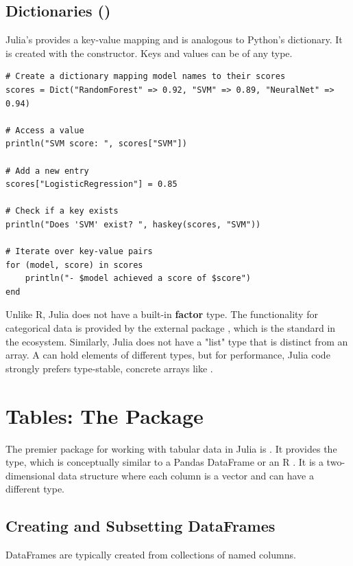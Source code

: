 \subsection*{Dictionaries ()}
Julia's \textbf{} provides a key-value mapping and is analogous to Python's dictionary. It is created with the  constructor. Keys and values can be of any type.

\text{ }\begin{verbatim}
# Create a dictionary mapping model names to their scores
scores = Dict("RandomForest" => 0.92, "SVM" => 0.89, "NeuralNet" => 0.94)

# Access a value
println("SVM score: ", scores["SVM"])

# Add a new entry
scores["LogisticRegression"] = 0.85

# Check if a key exists
println("Does 'SVM' exist? ", haskey(scores, "SVM"))

# Iterate over key-value pairs
for (model, score) in scores
    println("- $model achieved a score of $score")
end
\end{verbatim}

\begin{remark}
Unlike R, Julia does not have a built-in \textbf{factor} type. The functionality for categorical data is provided by the external package \textbf{}, which is the standard in the ecosystem. Similarly, Julia does not have a "list" type that is distinct from an array. A  can hold elements of different types, but for performance, Julia code strongly prefers type-stable, concrete arrays like .
\end{remark}

\section{Tables: The  Package}
\label{sec:julia_dataframes}
The premier package for working with tabular data in Julia is \textbf{}. It provides the  type, which is conceptually similar to a Pandas DataFrame or an R . It is a two-dimensional data structure where each column is a vector and can have a different type.

\subsection*{Creating and Subsetting DataFrames}
DataFrames are typically created from collections of named columns.

